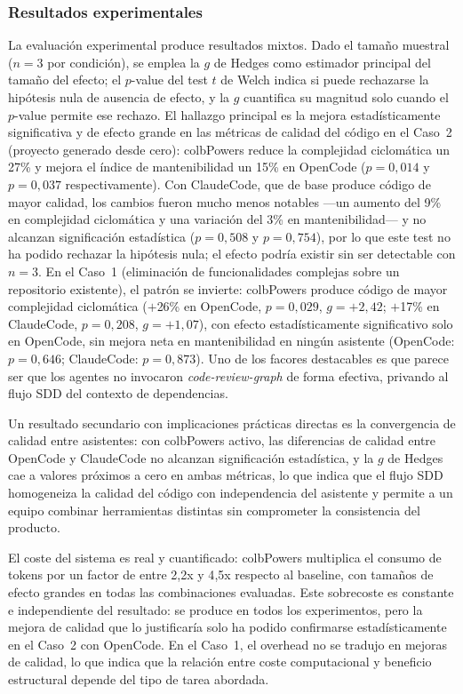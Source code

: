 \documentclass[11pt, letterpaper]{article}
\begin{document}
\subsubsection*{Resultados experimentales}

La evaluación experimental produce resultados mixtos. Dado el tamaño muestral ($n=3$ por condición), se emplea la $g$ de Hedges como estimador principal del tamaño del efecto; el $p$-value del test $t$ de Welch indica si puede rechazarse la hipótesis nula de ausencia de efecto, y la $g$ cuantifica su magnitud solo cuando el $p$-value permite ese rechazo. El hallazgo principal es la mejora estadísticamente significativa y de efecto grande en las métricas de calidad del código en el Caso~2 (proyecto generado desde cero): colbPowers reduce la complejidad ciclomática un 27\% y mejora el índice de mantenibilidad un 15\% en OpenCode ($p=0{,}014$ y $p=0{,}037$ respectivamente). Con ClaudeCode, que de base produce código de mayor calidad, los cambios fueron mucho menos notables ---un aumento del 9\% en complejidad ciclomática y una variación del 3\% en mantenibilidad--- y no alcanzan significación estadística ($p=0{,}508$ y $p=0{,}754$), por lo que este test no ha podido rechazar la hipótesis nula; el efecto podría existir sin ser detectable con $n=3$. En el Caso~1 (eliminación de funcionalidades complejas sobre un repositorio existente), el patrón se invierte: colbPowers produce código de mayor complejidad ciclomática ($+$26\% en OpenCode, $p=0{,}029$, $g=+2{,}42$; $+$17\% en ClaudeCode, $p=0{,}208$, $g=+1{,}07$), con efecto estadísticamente significativo solo en OpenCode, sin mejora neta en mantenibilidad en ningún asistente (OpenCode: $p=0{,}646$; ClaudeCode: $p=0{,}873$). Uno de los facores destacables es que parece ser que los agentes no invocaron \textit{code-review-graph} de forma efectiva, privando al flujo SDD del contexto de dependencias.

Un resultado secundario con implicaciones prácticas directas es la convergencia de calidad entre asistentes: con colbPowers activo, las diferencias de calidad entre OpenCode y ClaudeCode no alcanzan significación estadística, y la $g$ de Hedges cae a valores próximos a cero en ambas métricas, lo que indica que el flujo SDD homogeneiza la calidad del código con independencia del asistente y permite a un equipo combinar herramientas distintas sin comprometer la consistencia del producto.

El coste del sistema es real y cuantificado: colbPowers multiplica el consumo de tokens por un factor de entre 2{,}2x y 4{,}5x respecto al baseline, con tamaños de efecto grandes en todas las combinaciones evaluadas. Este sobrecoste es constante e independiente del resultado: se produce en todos los experimentos, pero la mejora de calidad que lo justificaría solo ha podido confirmarse estadísticamente en el Caso~2 con OpenCode. En el Caso~1, el overhead no se tradujo en mejoras de calidad, lo que indica que la relación entre coste computacional y beneficio estructural depende del tipo de tarea abordada.
\end{document}
